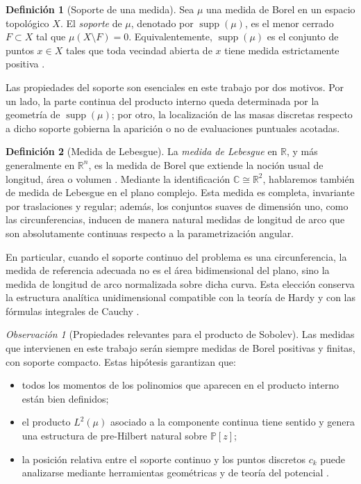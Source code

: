 \documentclass[12pt,a4paper]{article}
\theoremstyle{definition}
\newtheorem{definition}{Definición}
\theoremstyle{remark}
\newtheorem{remark}{Observación}
\newcommand{\Poly}{\mathbb{P}[z]}
\begin{document}
\begin{definition}[Soporte de una medida]
  Sea $\mu$ una medida de Borel en un espacio topológico $X$. El \emph{soporte} de $\mu$, denotado por $\operatorname{supp}(\mu)$, es el menor cerrado $F \subset X$ tal que $\mu(X\setminus F)=0$. Equivalentemente, $\operatorname{supp}(\mu)$ es el conjunto de puntos $x \in X$ tales que toda vecindad abierta de $x$ tiene medida estrictamente positiva \cite{folland1999real,bogachev2007measure}.
\end{definition}

Las propiedades del soporte son esenciales en este trabajo por dos motivos. Por un lado, la parte continua del producto interno queda determinada por la geometría de $\operatorname{supp}(\mu)$; por otro, la localización de las masas discretas respecto a dicho soporte gobierna la aparición o no de evaluaciones puntuales acotadas.

\begin{definition}[Medida de Lebesgue]
  La \emph{medida de Lebesgue} en $\mathbb{R}$, y más generalmente en $\mathbb{R}^n$, es la medida de Borel que extiende la noción usual de longitud, área o volumen \cite{folland1999real,rudin1987real}. Mediante la identificación $\mathbb{C} \cong \mathbb{R}^2$, hablaremos también de medida de Lebesgue en el plano complejo. Esta medida es completa, invariante por traslaciones y regular; además, los conjuntos suaves de dimensión uno, como las circunferencias, inducen de manera natural medidas de longitud de arco que son absolutamente continuas respecto a la parametrización angular.
\end{definition}

En particular, cuando el soporte continuo del problema es una circunferencia, la medida de referencia adecuada no es el área bidimensional del plano, sino la medida de longitud de arco normalizada sobre dicha curva. Esta elección conserva la estructura analítica unidimensional compatible con la teoría de Hardy y con las fórmulas integrales de Cauchy \cite{duren1970theory,szego1975orthogonal}.

\begin{remark}[Propiedades relevantes para el producto de Sobolev]
  Las medidas que intervienen en este trabajo serán siempre medidas de Borel positivas y finitas, con soporte compacto. Estas hipótesis garantizan que:
  \begin{itemize}
    \item todos los momentos de los polinomios que aparecen en el producto interno están bien definidos;
    \item el producto $L^2(\mu)$ asociado a la componente continua tiene sentido y genera una estructura de pre-Hilbert natural sobre $\Poly$;
    \item la posición relativa entre el soporte continuo y los puntos discretos $c_k$ puede analizarse mediante herramientas geométricas y de teoría del potencial \cite{stahl1992general,szego1975orthogonal}.
  \end{itemize}
\end{remark}
\end{document}
